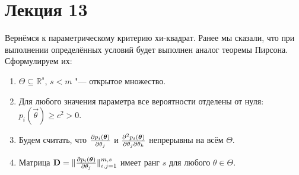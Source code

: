 
\section{Лекция 13}
Вернёмся к параметрическому критерию хи-квадрат. Ранее мы сказали, что при выполнении определённых условий будет выполнен аналог теоремы Пирсона. Сформулируем их:
\begin{enumerate}[label=\alph*)]
	\item $\Theta \subseteq \mathbb{R}^{s}$, $s < m$ "--- открытое множество.
	\item Для любого значения параметра все вероятности отделены от нуля: $p_{i}(\vec{\theta}) \geq c^{2} > 0$.
	\item Будем считать, что $\pdv{p_{i}(\bm{\theta})}{\theta_{j}}$ и $\pdv[2]{p_{i}(\bm{\theta})}{\theta_{j}}{\theta_{k}}$ непрерывны на всём $\Theta$.
	\item Матрица $\mathbf{D} = \|\pdv{p_{i}(\bm{\theta})}{\theta_{j}}\|_{i, j = 1}^{m, s}$ имеет ранг $s$ для любого $\theta \in \Theta$.
\end{enumerate}


